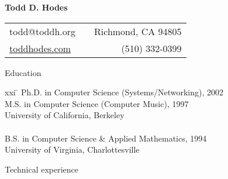 \setlength{\oddsidemargin}{0.175in}
\setlength{\evensidemargin}{0.175 in}
\setlength{\topmargin}{-0.95 in}
\setlength{\textwidth}{6.5 in}
\setlength{\textheight}{9.6 in}
\setlength{\headsep}{0.35 in}
\setlength{\parindent}{0 in}
\setlength{\parskip}{0.05 in}


\addtolength{\evensidemargin}{-15pt}
\addtolength{\oddsidemargin}{-15pt}

\pagestyle{empty}


\begin{center} \bf
\Large
                               Todd D. Hodes
\medskip
\normalsize


\begin{tabular}{lp{3.75in}r}
 todd@toddh.org   & & Richmond, CA 94805   \\
 \url{toddhodes.com} & &(510)  332-0399 \\
\end{tabular}


\end{center}

\bigskip


\begin{bf} \large
Education \\[-18pt]
\end{bf}

\begin{tabbing}
xxi \= \kill
\>   Ph.D. in Computer Science (Systems/Networking), 2002  \\
\>   M.S. in Computer Science (Computer Music), 1997  \\
\>   University of California, Berkeley  \\
\smallskip \\[-6pt]
\>   B.S. in Computer Science \& Applied Mathematics, 1994 \\
\>   University of Virginia, Charlottesville \\
\end{tabbing}


\begin{bf} \large
Technical experience  \\[-16pt]
\end{bf}

